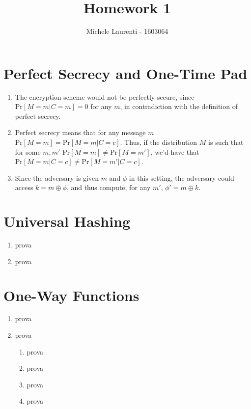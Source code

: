 \documentclass{article}
\title{Homework 1}
\author{Michele Laurenti - 1603064}
\newcommand{\xor}{\oplus}
\renewcommand{\Pr}[1]{\ensuremath{\mathrm{Pr} \left[ {#1} \right]}}
\begin{document}
\maketitle

\section{Perfect Secrecy and One-Time Pad}

\begin{enumerate}
	\item The encryption scheme would not be perfectly secure, since $\Pr{M=m | C=m} = 0$ for any $m$, in contradiction with the definition of perfect secrecy.

	\item Perfect secrecy means that for any message $m$ $\Pr{M=m} = \Pr{M=m|C=c}$.
		Thus, if the distribution $M$ is such that for some $m, m'$ $\Pr{M=m} \neq \Pr{M=m'}$, we'd have that $\Pr{M=m|C=c} \neq \Pr{M=m'|C=c}$.

	\item Since the adversary is given $m$ and $\phi$ in this setting, the adversary could access $k = m \xor \phi$, and thus compute, for any $m'$, $\phi' = m \xor k$.
\end{enumerate}

\section{Universal Hashing}

\begin{enumerate}
	\item prova

	\item prova
\end{enumerate}

\section{One-Way Functions}

\begin{enumerate}
	\item prova

	\item prova
		\begin{enumerate}
			\item prova
			\item prova
			\item prova
			\item prova
		\end{enumerate}
\end{enumerate}
\end{document}
